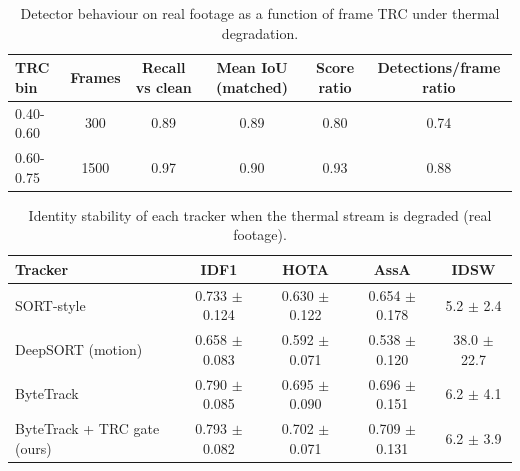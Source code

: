 \begin{table}[t]
\centering
\caption{Detector behaviour on real footage as a function of frame TRC under thermal degradation.}
\label{tab:coupling}
\begin{tabular}{lccccc}
\toprule
TRC bin & Frames & Recall vs clean & Mean IoU (matched) & Score ratio & Detections/frame ratio \\
\midrule
0.40-0.60 & 300 & 0.89 & 0.89 & 0.80 & 0.74 \\
0.60-0.75 & 1500 & 0.97 & 0.90 & 0.93 & 0.88 \\
\bottomrule
\end{tabular}
\end{table}

\begin{table}[t]
\centering
\caption{Identity stability of each tracker when the thermal stream is degraded (real footage).}
\label{tab:stress}
\begin{tabular}{lcccc}
\toprule
Tracker & IDF1 & HOTA & AssA & IDSW \\
\midrule
SORT-style & 0.733 $\pm$ 0.124 & 0.630 $\pm$ 0.122 & 0.654 $\pm$ 0.178 & 5.2 $\pm$ 2.4 \\
DeepSORT (motion) & 0.658 $\pm$ 0.083 & 0.592 $\pm$ 0.071 & 0.538 $\pm$ 0.120 & 38.0 $\pm$ 22.7 \\
ByteTrack & 0.790 $\pm$ 0.085 & 0.695 $\pm$ 0.090 & 0.696 $\pm$ 0.151 & 6.2 $\pm$ 4.1 \\
ByteTrack + TRC gate (ours) & 0.793 $\pm$ 0.082 & 0.702 $\pm$ 0.071 & 0.709 $\pm$ 0.131 & 6.2 $\pm$ 3.9 \\
\bottomrule
\end{tabular}
\end{table}
